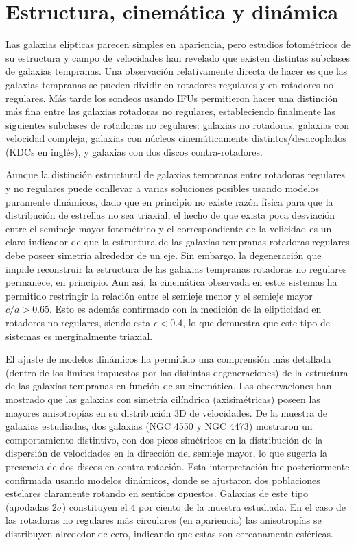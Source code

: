 \documentclass[a4paper,twoside]{article}
\begin{document}
\section{Estructura, cinemática y dinámica}

Las galaxias elípticas parecen simples en apariencia, pero estudios fotométricos de su estructura y campo de velocidades han revelado que existen distintas subclases de galaxias tempranas. Una observación relativamente directa de hacer es que las galaxias tempranas se pueden dividir en rotadores regulares y en rotadores no regulares. Más tarde los sondeos usando IFUs permitieron hacer una distinción más fina entre las galaxias rotadoras no regulares, estableciendo finalmente las siguientes subclases de rotadoras no regulares: galaxias no rotadoras, galaxias con velocidad compleja, galaxias con núcleos cinemáticamente distintos/desacoplados (KDCs en inglés), y galaxias con dos discos contra-rotadores.

Aunque la distinción estructural de galaxias tempranas entre rotadoras regulares y no regulares puede conllevar a varias soluciones posibles usando modelos puramente dinámicos, dado que en principio no existe razón física para que la distribución de estrellas no sea triaxial, el hecho de que exista poca desviación entre el semineje mayor fotométrico y el correspondiente de la velicidad es un claro indicador de que la estructura de las galaxias tempranas rotadoras regulares debe poseer simetría alrededor de un eje. Sin embargo, la degeneración que impide reconstruir la estructura de las galaxias tempranas rotadoras no regulares permanece, en principio. Aun así, la cinemática observada en estos sistemas ha permitido restringir la relación entre el semieje menor y el semieje mayor $c/a>0.65$. Esto es además confirmado con la medición de la elipticidad en rotadores no regulares, siendo esta $\epsilon<0.4$, lo que demuestra que este tipo de sistemas es merginalmente triaxial.

El ajuste de modelos dinámicos ha permitido una comprensión más detallada (dentro de los límites impuestos por las distintas degeneraciones) de la estructura de las galaxias tempranas en función de su cinemática. Las observaciones han mostrado que las galaxias con simetría cilíndrica (axisimétricas) poseen las mayores anisotropías en su distribución 3D de velocidades. De la muestra de galaxias estudiadas, dos galaxias (NGC 4550 y NGC 4473) mostraron un comportamiento distintivo, con dos picos simétricos en la distribución de la dispersión de velocidades en la dirección del semieje mayor, lo que sugería la presencia de dos discos en contra rotación. Esta interpretación fue posteriormente confirmada usando modelos dinámicos, donde se ajustaron dos poblaciones estelares claramente rotando en sentidos opuestos. Galaxias de este tipo (apodadas $2\sigma$) constituyen el $4$ por ciento de la muestra estudiada. En el caso de las rotadoras no regulares más circulares (en apariencia) las anisotropías se distribuyen alrededor de cero, indicando que estas son cercanamente esféricas.
\end{document}
